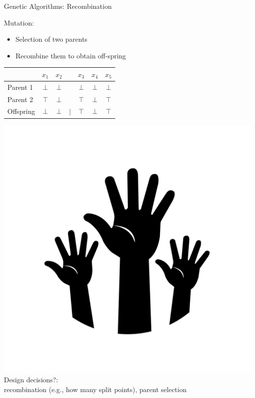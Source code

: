 \begin{frame}[c]{Genetic Algorithms: Recombination}

\begin{block}{Mutation:}
\begin{itemize}
  \item Selection of two parents
  \item Recombine them to obtain off-spring
\end{itemize}
\end{block}

\pause
\bigskip

\centering
\begin{tabular}{lcccccc}
& $x_1$ & $x_2$ & & $x_3$ & $x_4$ & $x_5$\\
\hline
Parent 1 & $\bot$ & $\bot$ & & $\bot$ & $\bot$ & $\bot$ \\
Parent 2 & $\top$ & $\bot$ & & $\top$ & $\bot$ & $\top$ \\
\pause
Offspring & $\bot$ & $\bot$ & $\mid$ & $\top$ & $\bot$ & $\top$ \\
\end{tabular}

\pause
\medskip
\includegraphics[scale=.03]{images/hands.png}
\alert{Design decisions?}:\\
\pause recombination (e.g., how many split points), parent selection

\end{frame}
